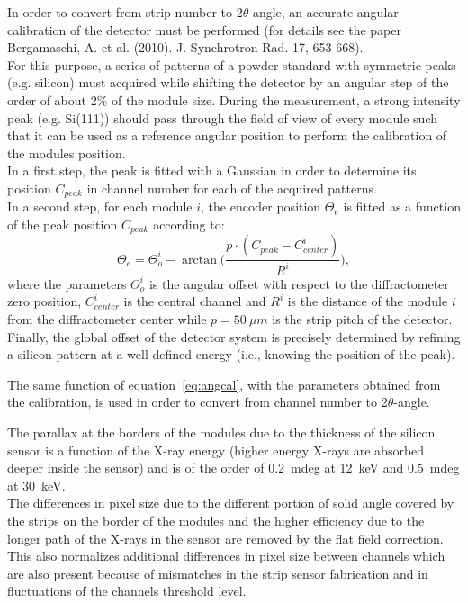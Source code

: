 
In order to convert from strip number to 2$\theta$-angle, an accurate angular calibration of the detector must be performed (for details see the paper Bergamaschi, A. et al. (2010). J. Synchrotron Rad. 17, 653-668). \\

For this purpose, a series of patterns of a powder standard with symmetric peaks (e.g. silicon) must acquired while shifting the detector by an angular step of the order of about 2\% of the module size. During the measurement, a strong intensity peak (e.g. Si(111)) should pass through the field of view of every module such that it can be used as a reference angular position to perform the calibration of the modules position.\\

In a first step, the   peak is fitted with a Gaussian in order to determine its position $C_{peak}$ in channel number for each of the acquired patterns.\\
In a second step, for each module $i$, the encoder position  $\Theta_e$  is fitted as a function of the peak position  $C_{peak}$  according to:
\begin{equation}\label{eq:angcal}
\Theta_e=\Theta_o^i-\arctan\Big(\frac{p \cdot (C_{peak}-C_{center}^i)}{R^i}\Big),
\end{equation} 
where the parameters $\Theta_o^i$ is the angular offset with respect to the diffractometer zero position, $C_{center}^{i}$ is the central channel  and $R^i$ is the distance of the module $i$ from the diffractometer center while $p=50~\mu m$ is the strip pitch of the detector. \\
Finally, the global offset of the detector system is precisely determined by refining a silicon pattern at a well-defined energy (i.e., knowing the position of the peak).

The same function of equation~\ref{eq:angcal}, with the parameters obtained from the calibration, is used in order to convert from channel number to 2$\theta$-angle.

The parallax at the borders of the modules due to the thickness of the silicon sensor is a function of the X-ray energy (higher energy X-rays are absorbed deeper inside the sensor) and is of the order of 0.2~mdeg at 12~keV and 0.5~mdeg at 30~keV. \\
The differences in pixel size due to the different portion of solid angle covered by the strips on the border of the modules and  the higher efficiency due to the longer path of the X-rays in the sensor are removed by the flat field correction. This also normalizes additional differences in pixel size between channels which are also present because of mismatches in the strip sensor fabrication and in fluctuations of the channels threshold level.
 
